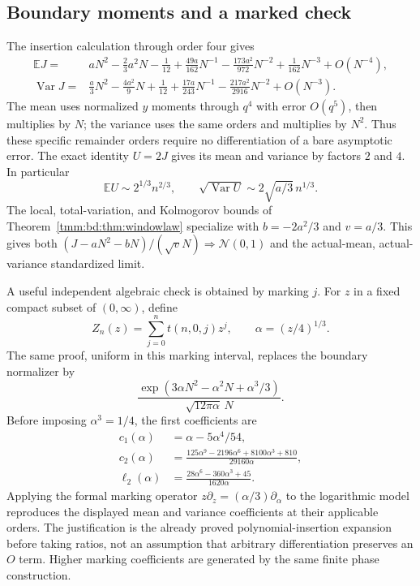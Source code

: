 \documentclass[11pt,letterpaper]{article}
\theoremstyle{remark}\newtheorem{remark}[theorem]{Remark}
\newcommand{\E}{\mathbb E}\newcommand{\Pp}{\mathbb P}
\newcommand{\Var}{\operatorname{Var}}\newcommand{\Poi}{\operatorname{Poisson}}
\newcommand{\Normal}{\mathcal N}
\begin{document}
\subsection{Boundary moments and a marked check}
The insertion calculation through order four gives
\begin{align}
 \E J={}&aN^2-\frac23a^2N-\frac1{12}
    +\frac{49a}{162}N^{-1}-\frac{173a^2}{972}N^{-2}
    +\frac1{162}N^{-3}+O(N^{-4}),\label{tmm:bd:eq:EJboundary}\\
 \Var J={}&\frac a3N^2-\frac{4a^2}{9}N+\frac1{12}
    +\frac{17a}{243}N^{-1}-\frac{217a^2}{2916}N^{-2}
    +O(N^{-3}).\label{tmm:bd:eq:VJboundary}
\end{align}
The mean uses normalized $y$ moments through $q^4$ with error $O(q^5)$, then multiplies by $N$; the variance uses the same orders and multiplies by $N^2$. Thus these specific remainder orders require no differentiation of a bare asymptotic error. The exact identity $U=2J$ gives its mean and variance by factors $2$ and $4$. In particular
\[
 \E U\sim 2^{1/3}n^{2/3},\qquad
 \sqrt{\Var U}\sim2\sqrt{a/3}\,n^{1/3}.
\]
The local, total-variation, and Kolmogorov bounds of Theorem~\ref{tmm:bd:thm:windowlaw} specialize with $b=-2a^2/3$ and $v=a/3$. This gives both $(J-aN^2-bN)/(\sqrt vN)\Rightarrow\Normal(0,1)$ and the actual-mean, actual-variance standardized limit.

A useful independent algebraic check is obtained by marking $j$. For $z$ in a fixed compact subset of $(0,\infty)$, define
\[
 Z_n(z)=\sum_{j=0}^nt(n,0,j)z^j,\qquad\alpha=(z/4)^{1/3}.
\]
The same proof, uniform in this marking interval, replaces the boundary normalizer by
\[
 \frac{\exp(3\alpha N^2-\alpha^2N+\alpha^3/3)}
 {\sqrt{12\pi\alpha}\,N}.
\]
Before imposing $\alpha^3=1/4$, the first coefficients are
\begin{align*}
 c_1(\alpha)&=\alpha-5\alpha^4/54,\\
 c_2(\alpha)&=\frac{125\alpha^9-2196\alpha^6+8100\alpha^3+810}
 {29160\alpha},\\
 \ell_2(\alpha)&=\frac{28\alpha^6-360\alpha^3+45}{1620\alpha}.
\end{align*}
Applying the formal marking operator $z\partial_z=(\alpha/3)\partial_\alpha$ to the logarithmic model reproduces the displayed mean and variance coefficients at their applicable orders. The justification is the already proved polynomial-insertion expansion before taking ratios, not an assumption that arbitrary differentiation preserves an $O$ term. Higher marking coefficients are generated by the same finite phase construction.
\end{document}
